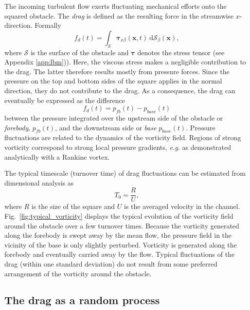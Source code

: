 %
The incoming turbulent flow exerts fluctuating mechanical efforts onto the squared obstacle.
The \textit{drag} is defined as the resulting force in the streamwise $x$-direction. Formally
\begin{equation}
\label{eq:drag_definition}
f_d(t) = \int_{\mathcal{S}} \boldsymbol{\tau}_{x \beta}(\mathbf{x},t) ~ \mathrm{d}{\mathcal{S}}_\beta(\mathbf{x}),
\end{equation}
where $\mathcal{S}$ is the surface of the obstacle and $\boldsymbol{\tau}$ denotes the stress tensor (see Appendix \ref{app:lbm})).
Here, the viscous stress makes a negligible contribution to the drag.
The latter therefore results mostly from pressure forces.
%
Since the pressure on the top and bottom sides of the square applies in the normal direction, they do not contribute to the drag.
As a consequence, the drag can eventually be expressed as the difference
\begin{equation}
\label{eq:drag_approx}
f_d(t) = p_{fb}(t) - p_{base}(t)
\end{equation}
between the pressure integrated over the upstream side of the obstacle or \textit{forebody}, $p_{fb}(t)$, and the downstream side or \textit{base} $p_{base}(t)$.
Pressure fluctuations are related to the dynamics of the vorticity field.
Regions of strong vorticity correspond to strong local pressure gradients, \emph{e.g.} as demonstrated analytically with a Rankine vortex.

The typical timescale (turnover time) of drag fluctuations can be estimated from dimensional analysis as
\begin{equation}
\label{eq:turnover_time}
T_0 = \frac{R}{U},
\end{equation}
where $R$ is the size of the square and $U$ is the averaged velocity in the channel.
%
%
Fig.~\ref{fig:typical_vorticity} displays the typical evolution of the vorticity field around the obstacle over a few turnover times.
Because the vorticity generated along the forebody is swept away by the mean flow, the pressure field in the vicinity of the base is only slightly perturbed.
Vorticity is generated along the forebody and eventually carried away by the flow.
Typical fluctuations of the drag (within one standard deviation) do not result from some preferred arrangement of the vorticity around the obstacle.
\subsection{The drag as a random process
}
\label{sec:pdfs}

